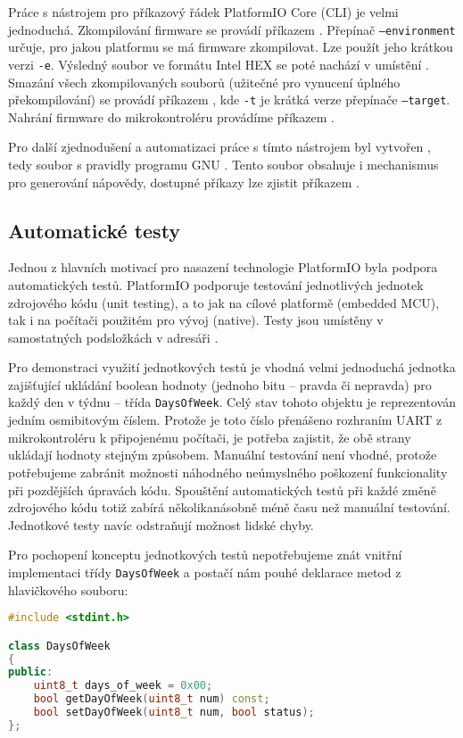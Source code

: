 Práce s nástrojem pro příkazový řádek PlatformIO Core (CLI) je velmi
jednoduchá. Zkompilování firmware se provádí příkazem
. Přepínač \texttt{--environment} určuje,
pro jakou platformu se má firmware zkompilovat. Lze použít jeho krátkou verzi
\texttt{-e}. Výsledný soubor ve formátu Intel HEX se poté nachází v umístění
. Smazání všech zkompilovaných souborů
(užitečné pro vynucení úplného překompilování) se provádí příkazem
, kde \texttt{-t} je krátká verze přepínače
\texttt{--target}. Nahrání firmware do mikrokontroléru provádíme příkazem
.

Pro další zjednodušení a automatizaci práce s tímto nástrojem byl vytvořen
, tedy soubor s pravidly programu GNU .
Tento soubor obsahuje i mechanismus pro generování nápovědy, dostupné příkazy
lze zjistit příkazem .

\subsection{Automatické testy}
Jednou z hlavních motivací pro nasazení technologie PlatformIO byla podpora
automatických testů. PlatformIO podporuje testování jednotlivých jednotek
zdrojového kódu (\foreignlanguage{english}{unit testing}),
a to jak na cílové platformě (embedded MCU), tak i na počítači použitém pro
vývoj (native). Testy jsou umístěny v samostatných podsložkách v adresáři
.

Pro demonstraci využití jednotkových testů je vhodná velmi jednoduchá jednotka
zajišťující ukládání boolean hodnoty (jednoho bitu -- pravda či nepravda) pro
každý den v týdnu -- třída \texttt{DaysOfWeek}. Celý stav tohoto objektu je
reprezentován jedním osmibitovým číslem. Protože je toto číslo přenášeno
rozhraním UART z mikrokontroléru k připojenému počítači, je potřeba zajistit,
že obě strany ukládají hodnoty stejným způsobem. Manuální testování není
vhodné, protože potřebujeme zabránit možnosti náhodného neúmyslného poškození
funkcionality při pozdějších úpravách kódu. Spouštění automatických testů při
každé změně zdrojového kódu totiž zabírá několikanásobně méně času než manuální
testování. Jednotkové testy navíc odstraňují možnost lidské chyby.

Pro pochopení konceptu jednotkových testů nepotřebujeme znát vnitřní
implementaci třídy \texttt{DaysOfWeek} a postačí nám pouhé deklarace
metod z hlavičkového souboru:
\begin{lstlisting}[language=C++]
#include <stdint.h>

class DaysOfWeek
{
public:
    uint8_t days_of_week = 0x00;
    bool getDayOfWeek(uint8_t num) const;
    bool setDayOfWeek(uint8_t num, bool status);
};
\end{lstlisting}


